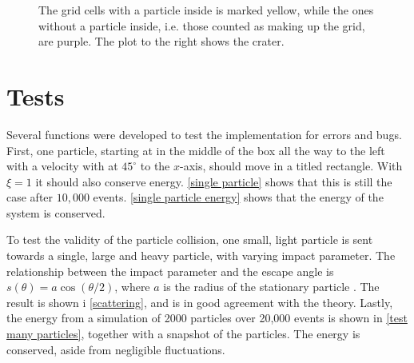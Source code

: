 \documentclass{article}
\begin{document}
\begin{figure}[H]
\begin{subfigure}{.59\textwidth}
        \end{subfigure}
        \caption{The grid cells with a particle inside is marked yellow, while the ones without a particle inside, i.e. those counted as making up the grid, are purple. The plot to the right shows the crater.}
        \label{crater}
    \end{figure}


    \section*{Tests}
    Several functions were developed to test the implementation for errors and bugs. First, one particle, starting at in the middle of the box all the way to the left with a velocity with at $45^\circ$ to the $x$-axis, should move in a titled rectangle. With $\xi=1$ it should also conserve energy. \autoref{single particle} shows that this is still the case after $10,000$ events. \autoref{single particle energy} shows that the energy of the system is conserved.
    
    To test the validity of the particle collision, one small, light particle is sent towards a single, large and heavy particle, with varying impact parameter. The relationship between the impact parameter and the escape angle is $s(\theta) = a \cos(\theta / 2)$, where $a$ is the radius of the stationary particle \cite{klasmek}. The result is shown i \autoref{scattering}, and is in good agreement with the theory. Lastly, the energy from a simulation of 2000 particles over 20,000 events is shown in \autoref{test many particles}, together with a snapshot of the particles. The energy is conserved, aside from negligible fluctuations.
\end{document}
